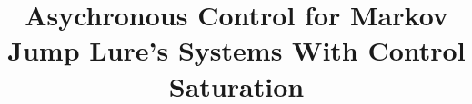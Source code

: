 \documentclass[conference]{IEEEtran}
\begin{document}
%
\title{Asychronous Control for Markov Jump Lure's Systems With Control Saturation}




% 
\end{document}

